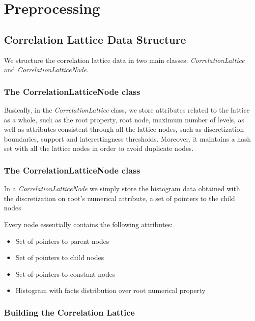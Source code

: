 \section{Preprocessing}

\subsection{Correlation Lattice Data Structure}

We structure the correlation lattice data in two main classes: \emph{CorrelationLattice} and
\emph{CorrelationLatticeNode}. 

\subsubsection{The CorrelationLatticeNode class}

Basically, in the \emph{CorrelationLattice} class, we store attributes related to the lattice as
a whole, such as the root property, root node, maximum number of levels, as well as attributes consistent through all
the lattice nodes, such as discretization boundaries, support and interestingness thresholds. Moreover, it maintains a
hash set with all the lattice nodes in order to avoid duplicate nodes.


\subsubsection{The CorrelationLatticeNode class}

In a \emph{CorrelationLatticeNode} we simply store the histogram data obtained with the discretization on root's
numerical attribute, a set of pointers to the child nodes

Every node essentially contains the following attributes:

\begin{itemize}
 \item Set of pointers to parent nodes
 \item Set of pointers to child nodes
 \item Set of pointers to constant nodes
 \item Histogram with facts distribution over root numerical property
\end{itemize}


\subsubsection{Building the Correlation Lattice}

